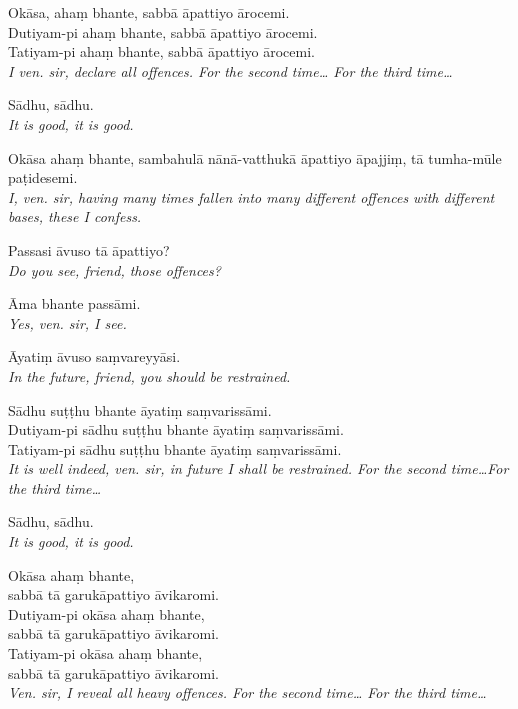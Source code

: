 \hangindent=25pt%
\parbox{22pt}{} Okāsa, ahaṃ bhante, sabbā āpattiyo ārocemi.\\
Dutiyam-pi ahaṃ bhante, sabbā āpattiyo ārocemi.\\
Tatiyam-pi ahaṃ bhante, sabbā āpattiyo ārocemi.\\
\emph{I ven. sir, declare all offences. For the second time… For the third time…}

\hangindent=25pt%
\parbox{22pt}{} Sādhu, sādhu.\\ \emph{It is good, it is good.}

\hangindent=25pt%
\parbox{22pt}{} Okāsa ahaṃ bhante, sambahulā nānā-vatthukā āpattiyo āpajjiṃ, tā tumha-mūle paṭidesemi.\\ \emph{I, ven. sir, having many times fallen into many different offences with different bases, these I confess.}

\hangindent=25pt%
\parbox{22pt}{} Passasi āvuso tā āpattiyo?\\ \emph{Do you see, friend, those offences?}

\hangindent=25pt%
\parbox{22pt}{} Āma bhante passāmi.\\ \emph{Yes, ven. sir, I see.}

\hangindent=25pt%
\parbox{22pt}{} Āyatiṃ āvuso saṃvareyyāsi.\\ \emph{In the future, friend, you should be restrained.}

\hangindent=25pt%
\parbox{22pt}{} Sādhu suṭṭhu bhante āyatiṃ saṃvarissāmi.\\
Dutiyam-pi sādhu suṭṭhu bhante āyatiṃ saṃvarissāmi.\\
Tatiyam-pi sādhu suṭṭhu bhante āyatiṃ saṃvarissāmi.\\
\emph{It is well indeed, ven. sir, in future I shall be restrained. For the second time…For the third time…}

\hangindent=25pt%
\parbox{22pt}{} Sādhu, sādhu.\\ \emph{It is good, it is good.}

\hangindent=25pt%
\parbox{22pt}{} Okāsa ahaṃ bhante,\\
sabbā tā garukāpattiyo āvikaromi.\\
Dutiyam-pi okāsa ahaṃ bhante,\\
sabbā tā garukāpattiyo āvikaromi.\\
Tatiyam-pi okāsa ahaṃ bhante,\\
sabbā tā garukāpattiyo āvikaromi.\\
\emph{Ven. sir, I reveal all heavy offences. For the second time… For the third time…}

